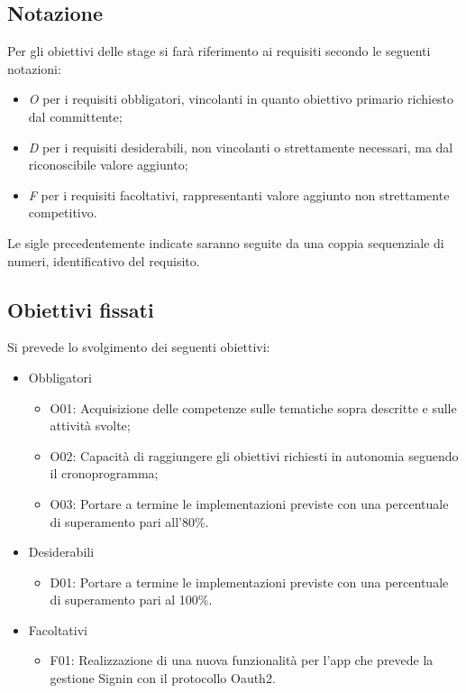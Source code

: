\subsection*{Notazione}
Per gli obiettivi delle stage si farà riferimento ai requisiti secondo le seguenti notazioni:
\begin{itemize}
	\item \textit{O} per i requisiti obbligatori, vincolanti in quanto obiettivo primario richiesto dal committente;
	\item \textit{D} per i requisiti desiderabili, non vincolanti o strettamente necessari,
	ma dal riconoscibile valore aggiunto;
	\item \textit{F} per i requisiti facoltativi, rappresentanti valore aggiunto non strettamente 
	competitivo.
\end{itemize}

Le sigle precedentemente indicate saranno seguite da una coppia sequenziale di numeri, identificativo del requisito.

\subsection*{Obiettivi fissati}
Si prevede lo svolgimento dei seguenti obiettivi:
\begin{itemize}
	\item Obbligatori
	\begin{itemize}
		\item	O01: Acquisizione delle competenze sulle tematiche sopra descritte e sulle attività svolte; \\
		\item O02: Capacità di raggiungere gli obiettivi richiesti in autonomia seguendo il cronoprogramma;\\
		\item O03: Portare a termine le implementazioni previste con una percentuale di superamento pari all’80\%.\\
	\end{itemize}
	
	\item Desiderabili 
	\begin{itemize}
		\item D01: Portare a termine le implementazioni previste con una percentuale di superamento pari al 100\%.\\
	\end{itemize}
	
	\item Facoltativi
	\begin{itemize}
		\item F01:  Realizzazione di una nuova funzionalità per l'app che prevede la gestione Signin con il protocollo Oauth2.\\
	\end{itemize} 
\end{itemize}

